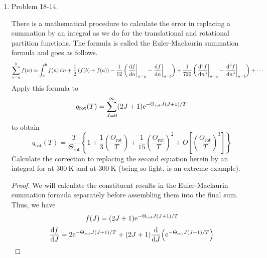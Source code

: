 \documentclass[../psets.tex]{subfiles}
\begin{document}
\begin{enumerate}
\begin{enumerate}
\begin{proof}
\begin{align*}
            \end{align*}
            Therefore,
            \begin{align*}
                \prb{P} &= k_BT\pdv{\ln Q}{V}\\
                &= k_BT\pdv{V}(N\ln(V-b))\\
                \Aboxed{\prb{P} &= \frac{Nk_BT}{V-b}}
            \end{align*}
        \end{proof}
    \end{enumerate}
    \item Problem 18-14.\par
    There is a mathematical procedure to calculate the error in replacing a summation by an integral as we do for the translational and rotational partition functions. The formula is called the Euler-Maclaurin summation formula and goes as follows.
    \begin{equation*}
        \sum_{n=a}^bf(n) = \int_a^bf(n)\dd{n}+\frac{1}{2}\left( f(b)+f(a) \right)-\frac{1}{12}\left( \eval{\dv{f}{n}}_{n=a}-\eval{\dv{f}{n}}_{n=b} \right)+\frac{1}{720}\left( \eval{\dv[3]{f}{n}}_{n=a}-\eval{\dv[3]{f}{n}}_{n=b} \right)+\cdots
    \end{equation*}
    Apply this formula to
    \begin{equation*}
        q_\text{rot}(T) = \sum_{J=0}^\infty(2J+1)\e[-\Theta_\text{rot}J(J+1)/T]
    \end{equation*}
    to obtain
    \begin{equation*}
        q_\text{rot}(T) = \frac{T}{\Theta_\text{rot}}\left\{ 1+\frac{1}{3}\left( \frac{\Theta_\text{rot}}{T} \right)+\frac{1}{15}\left( \frac{\Theta_\text{rot}}{T} \right)^2+O\left[ \left( \frac{\Theta_\text{rot}}{T} \right)^3 \right] \right\}
    \end{equation*}
    Calculate the correction to replacing the second equation herein by an integral for  at $\SI{300}{\kelvin}$ and  at $\SI{300}{\kelvin}$ (being so light,  is an extreme example).
    \begin{proof}
        We will calculate the constituent results in the Euler-Maclaurin summation formula separately before assembling them into the final sum. Thus, we have
        \begin{equation*}
            f(J) = (2J+1)\e[-\Theta_\text{rot}J(J+1)/T]
        \end{equation*}
        \begin{align*}
            \dv{f}{J} &= 2\e[-\Theta_\text{rot}J(J+1)/T]+(2J+1)\dv{J}(\e[-\Theta_\text{rot}J(J+1)/T])\\

\end{align*}
\end{proof}
\end{enumerate}
\end{document}
